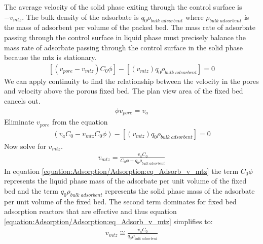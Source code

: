 \documentclass[letterpaper,10pt,english]{sphinxmanual}
\begin{document}
The average velocity of the solid phase exiting through the control surface is \(-v_{mtz}\). The bulk density of the adsorbate is \(q_0 \rho_{bulk \; adsorbent}\) where \(\rho_{bulk \; adsorbent}\) is the mass of adsorbent per volume of the packed bed. The mass rate of adsorbate passing through the control surface in liquid phase must precisely balance the mass rate of adsorbate passing through the control surface in the solid phase because the mtz is stationary.
\begin{equation}\label{equation:Adsorption/Adsorption:Adsorption/Adsorption:1}
\begin{split}[(v_{pore} - v_{mtz})C_0\phi] - [(v_{mtz})q_0 \rho_{bulk \; adsorbent}] = 0\end{split}
\end{equation}
We can apply continuity to find the relationship between the velocity in the pores and velocity above the porous fixed bed. The plan view area of the fixed bed cancels out.
\begin{equation}\label{equation:Adsorption/Adsorption:Adsorption/Adsorption:2}
\begin{split}\phi v_{pore} = v_a\end{split}
\end{equation}
Eliminate \(v_{pore}\) from the equation
\begin{equation}\label{equation:Adsorption/Adsorption:Adsorption/Adsorption:3}
\begin{split}(v_a C_0 - v_{mtz}C_0\phi) - [(v_{mtz})q_0 \rho_{bulk \; adsorbent}] = 0\end{split}
\end{equation}
Now solve for \(v_{mtz}\).
\begin{equation}\label{equation:Adsorption/Adsorption:eq_Adsorb_v_mtz}
\begin{split}v_{mtz}=\frac{v_a C_0}{C_0\phi + q_0 \rho_{bulk \; adsorbent}}\end{split}
\end{equation}
In equation \eqref{equation:Adsorption/Adsorption:eq_Adsorb_v_mtz} the term \(C_0\phi\) represents the liquid phase mass of the adsorbate per unit volume of the fixed bed and the term \(q_0 \rho_{bulk \; adsorbent}\) represents the solid phase mass of the adsorbate per unit volume of the fixed bed. The second term dominates for fixed bed adsorption reactors that are effective and thus equation \eqref{equation:Adsorption/Adsorption:eq_Adsorb_v_mtz} simplifies to:
\begin{equation}\label{equation:Adsorption/Adsorption:eq_Adsorb_v_mtz_simple}
\begin{split}v_{mtz} \cong \frac{v_a C_0}{q_0 \rho_{bulk \; adsorbent}}\end{split}
\end{equation}
\end{document}
